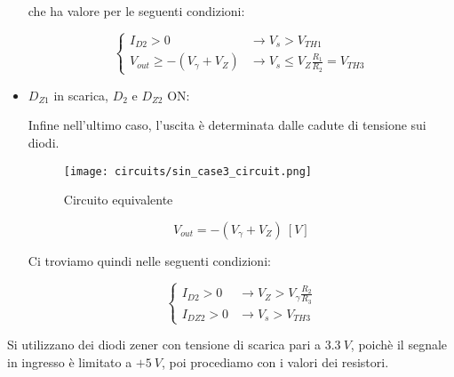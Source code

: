 \begin{itemize}
          che ha valore per le seguenti condizioni:

          \begin{equation}
              \left\{
              \begin{array}{ll}
                  I_{D2}> 0                    & \rightarrow V_s>V_{TH1}                        \\
                  V_{out}\geq-(V_{\gamma}+V_Z) & \rightarrow V_s\leq V_Z\frac{R_1}{R_2}=V_{TH3}
              \end{array}
              \right.
          \end{equation}

    \item $D_{Z1}$ in scarica, $D_2$ e $D_{Z2}$ ON:

          Infine nell'ultimo caso, l'uscita è determinata dalle cadute di tensione sui diodi.

          \begin{minipage}{0.45\textwidth}
              \centering
              \begin{figure}[H]
                  \centering
                  \texttt{[image: circuits/sin\_case3\_circuit.png]}
                  \caption{Circuito equivalente}
                  \label{sin_case3_circuit}
              \end{figure}
          \end{minipage}
          \begin{minipage}{0.45\textwidth}
              \centering
              \begin{equation}
                  V_{out}=-(V_{\gamma}+V_Z)\ [V]
              \end{equation}
          \end{minipage}

          Ci troviamo quindi nelle seguenti condizioni:

          \begin{equation}
              \left\{
              \begin{array}{ll}
                  I_{D2}> 0  & \rightarrow V_Z>V_\gamma\frac{R_2}{R_3} \\
                  I_{DZ2}> 0 & \rightarrow V_s>V_{TH3}
              \end{array}
              \right.
          \end{equation}

\end{itemize}

Si utilizzano dei diodi zener con tensione di scarica pari a $3.3\ V$, poichè il segnale in
ingresso è limitato a $+5\ V$, poi procediamo con i valori dei resistori.

